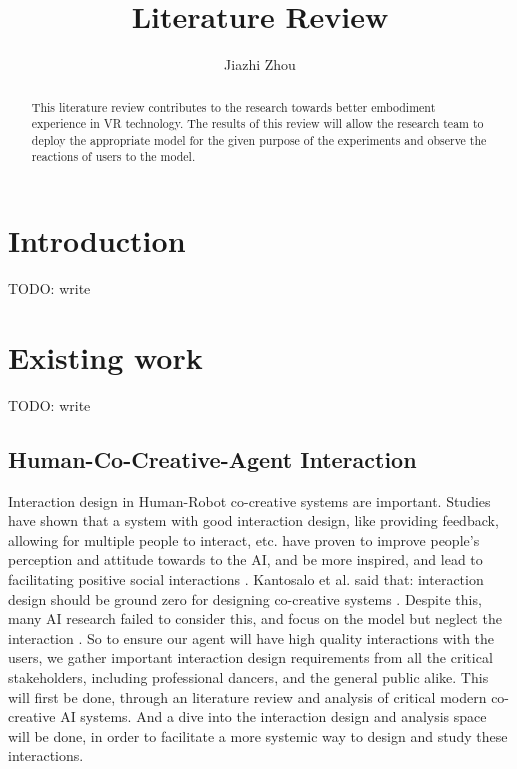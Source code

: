 \documentclass[final,5p,times,twocolumn,authoryear]{article}
\begin{document}
\title{Literature Review}
\author{Jiazhi Zhou}
\maketitle

\begin{abstract}

This literature review contributes to the research towards better
embodiment experience in VR technology. The results of this review will
allow the research team to deploy the appropriate model for the given
purpose of the experiments and observe the reactions of users to the
model.

\end{abstract}

\section{Introduction}

TODO: write

\section{Existing work}

TODO: write



\subsection{Human-Co-Creative-Agent Interaction}
Interaction design in Human-Robot co-creative systems are important.
Studies have shown that a system with good interaction design, like
providing feedback, allowing for multiple people to interact, etc. have
proven to improve people's perception and attitude towards to the AI,
and be more inspired, and lead to facilitating positive social
interactions \cite{Long2019, Rezwana2022}. Kantosalo et al. said that:
interaction design should be ground zero for designing co-creative
systems \cite{Kantosalo2020}.  Despite this, many AI research failed to
consider this, and focus on the model but neglect the interaction
\cite{Rezwana2023}. So to ensure our agent will have high quality
interactions with the users, we gather important interaction design
requirements from all the critical stakeholders, including professional
dancers, and the general public alike. This will first be done, through an literature
review and analysis of critical modern co-creative AI systems. And a
dive into the interaction design and analysis space will be done, in
order to facilitate a more systemic way to design and study these
interactions.
\end{document}
